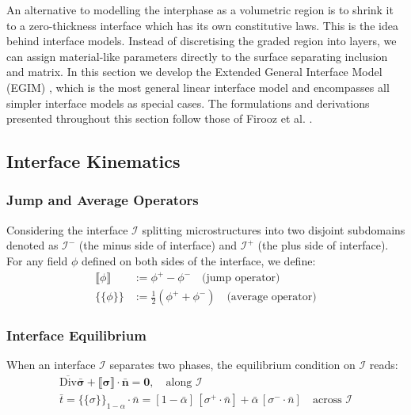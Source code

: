 \documentclass[oneside, 12pt, a4paper, bibliography=totoc]{book}
\newcommand{\jump}[1]{\llbracket #1 \rrbracket}    %
\newcommand{\bs}[1]{\bm{#1}}                       %
\begin{document}
An alternative to modelling the interphase as a volumetric region is to shrink it to a zero-thickness interface which has its own constitutive laws. This is the idea behind interface models. Instead of discretising the graded region into layers, we can assign material-like parameters directly to the surface separating inclusion and matrix. In this section we develop the Extended General Interface Model (EGIM) \cite{Firooz2022}, which is the most general linear interface model and encompasses all simpler interface models as special cases. The formulations and derivations presented throughout this section follow those of Firooz et al. \cite{Firooz2022}.

\subsection{Interface Kinematics}
\label{subsec:interface_kinematics}

\subsubsection{Jump and Average Operators}

Considering the interface $\mathcal{I}$ splitting microstructures into two disjoint subdomains denoted as $\mathcal{I}^-$ (the minus side of interface) and $\mathcal{I}^+$ (the plus side of interface). For any field $\phi$ defined on both sides of the interface, we define:
%
\begin{align}
    \jump{\phi} &:= \phi^+ - \phi^- \quad \text{(jump operator)} \label{eq:jump_op}\\
    \{\!\{ \phi \}\!\} &:= \frac{1}{2}\left(\phi^+ + \phi^-\right) \quad \text{(average operator)} \label{eq:avg_op}
\end{align}
%
\subsubsection{Interface Equilibrium}

When an interface $\mathcal{I}$ separates two phases, the equilibrium condition on $\mathcal{I}$ reads:
%
\begin{align}
    \overline{\mathrm{Div}}\bar{\bs{\sigma}} + \jump{\bs{\sigma}} \cdot \bs{\bar{n}} = \bs{0}, \quad \text{along } \mathcal{I} \\
    \bar{t} = \{\!\{\sigma\}\!\}_{1-\alpha} \cdot \bar{n} 
= [1-\bar{\alpha}]\, [\sigma^{+}\cdot\bar{n}]
+ \bar{\alpha}\, [\sigma^{-}\cdot\bar{n}]
 \quad \text{across } \mathcal{I}
    \label{eq:interface_equilibrium}
\end{align}
%
\end{document}
